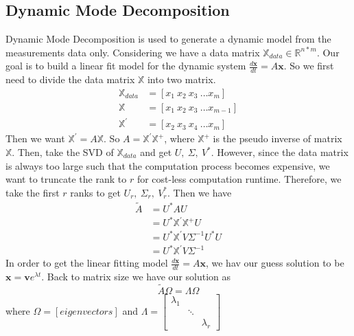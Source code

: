 \documentclass[twoside,twocolumn]{article}
\begin{document}
    \subsection{Dynamic Mode Decomposition}
    Dynamic Mode Decomposition is used to generate a dynamic model from the measurements data only. Considering we have a data 
    matrix $\mathbb{X}_{data} \in \mathbb{R}^{n * m}$. Our goal is to build a linear fit model for the dynamic system 
    $\frac{d\mathbf{x}}{dt} = A\mathbf{x}$. So we first need to divide the data matrix $\mathbb{X}$ into two matrix.
    \begin{align*}
        \mathbb{X}_{data} &= [x_1\ x_2\ x_3\ \dots x_m] \\
        \mathbb{X} &= [x_1\ x_2\ x_3\ \dots x_{m - 1}] \\ 
        \mathbb{X^\prime} &= [x_2\ x_3\ x_4\ \dots x_{m}]
    \end{align*}
    Then we want $\mathbb{X^\prime} = A\mathbb{X}$. So $A = \mathbb{X^\prime} \mathbb{X}^{+}$, where $\mathbb{X}^{+}$ is the pseudo
    inverse of matrix $\mathbb{X}$. Then, take the SVD of $\mathbb{X}_{data}$ and get $U,\ \Sigma,\ V^*$. However, since the data 
    matrix is always too large such that the computation process becomes expensive, we want to truncate the rank to $r$ for cost-less
    computation runtime. Therefore, we take the first $r$ ranks to get $U_r,\ \Sigma_r,\ V^*_r$. Then we have
    \begin{align*}
        \widetilde{A} &= U^* A U \\ 
                      &= U^* \mathbb{X^\prime} \mathbb{X}^{+} U \\
                      &= U^* \mathbb{X^\prime} V \Sigma^{-1} U^* U \\
                      &= U^* \mathbb{X^\prime} V \Sigma^{-1}
    \end{align*} 
    In order to get the linear fitting model $\frac{d\mathbf{x}}{dt} = A\mathbf{x}$, we hav our guess solution to be
    $\mathbf{x} = \mathbf{v}e^{\lambda t}$. Back to matrix size we have our solution as
    \begin{equation*}
        \widetilde{A}\Omega = \Lambda \Omega
    \end{equation*}
    where $\Omega = [eigenvectors]$ and $\Lambda =   
                                                    \begin{bmatrix}
                                                        \lambda_{1} & & \\
                                                        & \ddots & \\
                                                        & & \lambda_{r}
                                                    \end{bmatrix}$
\end{document}
